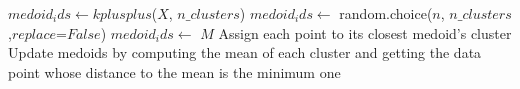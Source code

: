 \begin{algorithmic}[1]
		\State $medoid_ids \leftarrow kplusplus$($X$, $n\_clusters$)
		\State $medoid_ids \leftarrow$ random.choice($n$, $n\_clusters$,$replace$=$False$)
		\State $medoid_ids \leftarrow$ $M$
	\EndIf
		\State Assign each point to its closest medoid's cluster
		\State Update medoids by computing the mean of each cluster and getting the data point whose distance to the mean is the minimum one
	\EndFor
\EndProcedure
\end{algorithmic}